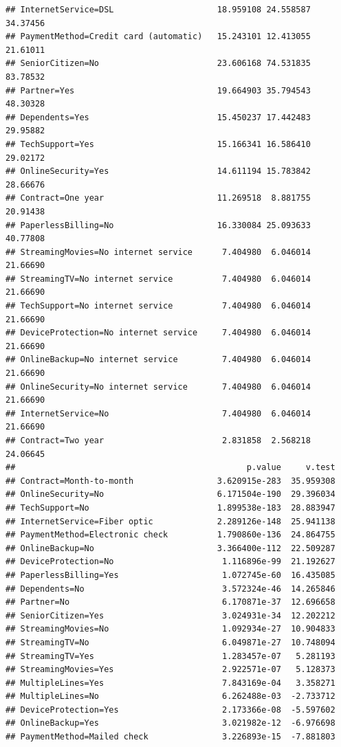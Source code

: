 \documentclass[
]{article}
\begin{document}
\begin{verbatim}
## InternetService=DSL                     18.959108 24.558587 34.37456
## PaymentMethod=Credit card (automatic)   15.243101 12.413055 21.61011
## SeniorCitizen=No                        23.606168 74.531835 83.78532
## Partner=Yes                             19.664903 35.794543 48.30328
## Dependents=Yes                          15.450237 17.442483 29.95882
## TechSupport=Yes                         15.166341 16.586410 29.02172
## OnlineSecurity=Yes                      14.611194 15.783842 28.66676
## Contract=One year                       11.269518  8.881755 20.91438
## PaperlessBilling=No                     16.330084 25.093633 40.77808
## StreamingMovies=No internet service      7.404980  6.046014 21.66690
## StreamingTV=No internet service          7.404980  6.046014 21.66690
## TechSupport=No internet service          7.404980  6.046014 21.66690
## DeviceProtection=No internet service     7.404980  6.046014 21.66690
## OnlineBackup=No internet service         7.404980  6.046014 21.66690
## OnlineSecurity=No internet service       7.404980  6.046014 21.66690
## InternetService=No                       7.404980  6.046014 21.66690
## Contract=Two year                        2.831858  2.568218 24.06645
##                                               p.value     v.test
## Contract=Month-to-month                 3.620915e-283  35.959308
## OnlineSecurity=No                       6.171504e-190  29.396034
## TechSupport=No                          1.899538e-183  28.883947
## InternetService=Fiber optic             2.289126e-148  25.941138
## PaymentMethod=Electronic check          1.790860e-136  24.864755
## OnlineBackup=No                         3.366400e-112  22.509287
## DeviceProtection=No                      1.116896e-99  21.192627
## PaperlessBilling=Yes                     1.072745e-60  16.435085
## Dependents=No                            3.572324e-46  14.265846
## Partner=No                               6.170871e-37  12.696658
## SeniorCitizen=Yes                        3.024931e-34  12.202212
## StreamingMovies=No                       1.092934e-27  10.904833
## StreamingTV=No                           6.049871e-27  10.748094
## StreamingTV=Yes                          1.283457e-07   5.281193
## StreamingMovies=Yes                      2.922571e-07   5.128373
## MultipleLines=Yes                        7.843169e-04   3.358271
## MultipleLines=No                         6.262488e-03  -2.733712
## DeviceProtection=Yes                     2.173366e-08  -5.597602
## OnlineBackup=Yes                         3.021982e-12  -6.976698
## PaymentMethod=Mailed check               3.226893e-15  -7.881803

\end{verbatim}
\end{document}
